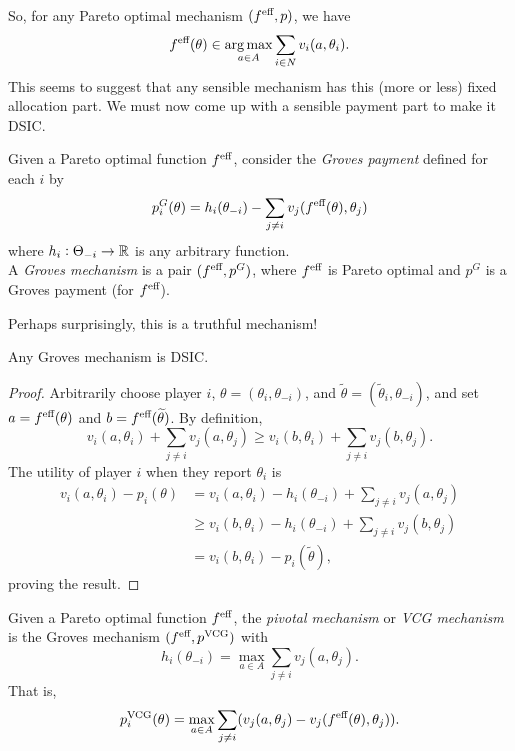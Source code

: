 		So, for any Pareto optimal mechanism $(f^{\text{eff}},p)$, we have
		\[ f^{\text{eff}}(\theta) \in \operatorname*{arg\,max}_{a \in A} \sum_{i \in N} v_i(a,\theta_i). \]
		This seems to suggest that any sensible mechanism has this (more or less) fixed allocation part. We must now come up with a sensible payment part to make it DSIC.
		
		\begin{fdef}
			Given a Pareto optimal function $f^{\text{eff}}$, consider the \emph{Groves payment} defined for each $i$ by
			\[ p_i^G(\theta) = h_i(\theta_{-i}) - \sum_{j \ne i} v_j(f^{\text{eff}}(\theta),\theta_j) \]
			where $h_i : \Theta_{-i} \to \mathbb{R}$ is any arbitrary function.\\
			A \emph{Groves mechanism} is a pair $(f^{\text{eff}},p^G)$, where $f^{\text{eff}}$ is Pareto optimal and $p^G$ is a Groves payment (for $f^{\text{eff}}$).
		\end{fdef}

		Perhaps surprisingly, this is a truthful mechanism!

		\begin{ftheo}
			Any Groves mechanism is DSIC.
		\end{ftheo}
		\begin{proof}
			Arbitrarily choose player $i$, $\theta = (\theta_i,\theta_{-i})$, and $\widetilde{\theta} = (\widetilde{\theta}_i,\theta_{-i})$, and set $a = f^{\text{eff}}(\theta)$ and $b = f^{\text{eff}}(\widetilde{\theta})$. By definition,
			\[ v_i(a,\theta_i) + \sum_{j \ne i} v_j(a,\theta_j) \ge v_i(b,\theta_i) + \sum_{j \ne i} v_j(b,\theta_j). \]
			The utility of player $i$ when they report $\theta_i$ is
			\begin{align*}
				v_i(a,\theta_i) - p_i(\theta) &= v_i(a,\theta_i) - h_i(\theta_{-i}) + \sum_{j \ne i} v_j(a,\theta_j) \\
				&\ge v_i(b,\theta_i) - h_i(\theta_{-i}) + \sum_{j \ne i} v_j(b,\theta_j) \\
				&= v_i(b,\theta_i) - p_i(\widetilde{\theta}),
			\end{align*}
			proving the result.
		\end{proof}

		\begin{fdef}
			Given a Pareto optimal function $f^{\text{eff}}$, the \emph{pivotal mechanism} or \emph{VCG mechanism} is the Groves mechanism $(f^{\text{eff}},p^{\text{VCG}})$ with
			\[ h_i(\theta_{-i}) = \max_{a \in A} \sum_{j \ne i} v_j(a,\theta_j). \]
			That is,
			\[ p_i^{\text{VCG}}(\theta) = \max_{a \in A} \sum_{j \ne i} (v_j(a,\theta_j) - v_j(f^{\text{eff}}(\theta),\theta_j)). \]
		\end{fdef}

